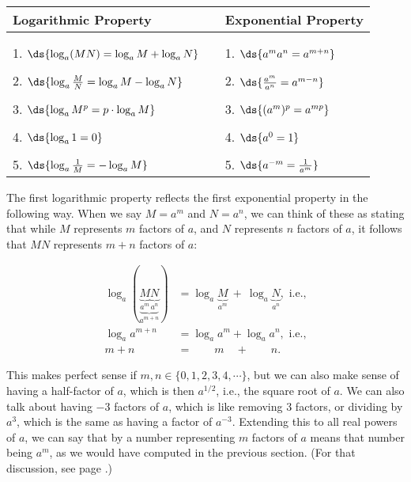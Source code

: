 \begin{center}
\begin{tabular}{lcl}
{Logarithmic Property}&\qquad\qquad&{Exponential Property}\\
\hline
&&\\
&&\\
1. $\ds{\log_a(MN)=\log_aM+\log_aN}$ &&1. $\ds{a^ma^n=a^{m+n}}$\\
&&\\
2. $\ds{\log_a\frac{M}N=\log_aM-\log_aN}$&&2. $\ds{\frac{a^m}{a^n}
                                                  =a^{m-n}}$\\
&&\\
3. $\ds{\log_a M^p=p\cdot\log_aM}$&&3. $\ds{(a^m)^p=a^{mp}}$\\
&&\\
4. $\ds{\log_a1=0}$&&4. $\ds{a^0=1}$\\
&&\\
5. $\ds{\log_a\frac1M=-\log_aM}$&&5. $\ds{a^{-m}=\frac1{a^m}}$

\end{tabular}
\end{center}

The first logarithmic property reflects the first exponential
property in the following way.  When we say $M=a^m$ and $N=a^n$,
we can think of these as stating 
that while $M$ represents $m$ factors of $a$, and $N$ represents $n$ 
factors of $a$, it follows that  $MN$ represents $m+n$ factors of $a$:  

\begin{align*}
\log_a(\underbrace{\underbrace{M}_{a^m}\underbrace{N}_{a^n}}_{a^{m+n}})
&=\log_a\underbrace{M}_{a^m}\ +\ \log_a\underbrace{N}_{a^n},\text{ i.e.,}\\
\log_{a}a^{m+n}&=\log_aa^m+\log_aa^n,\text{ i.e.,}\\
m+n&=\qquad m\quad+\qquad n.\end{align*}


This makes perfect sense if $m,n\in\{0,1,2,3,4,\cdots\}$,
but we can also  make sense of having a half-factor of $a$, which
is then $a^{1/2}$, i.e., the square root of $a$.  We 
can also talk about having $-3$ factors of $a$, which is
like removing 3 factors, or dividing by $a^3$, which is
the same as having a factor of $a^{-3}$. Extending this
to all real powers of $a$, we can say that by a number
representing $m$ factors of $a$ means that number being $a^m$,
as we would have computed in the previous section.
(For that discussion, see page 
\pageref{NeedPageForIrrationalPowersOfAExplained}.)


